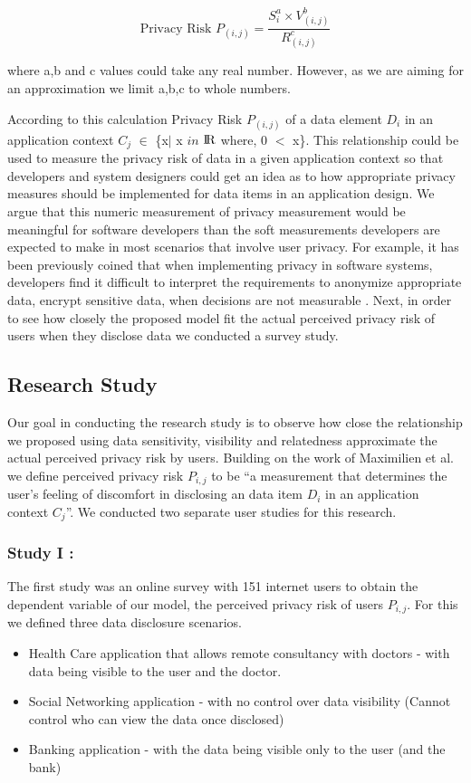 \documentclass[10pt]{article}
\begin{document}
\[
\text {Privacy Risk $P_{(i,j)}$} =\frac{S_{i}^a \times V_{(i,j)}^b}{R_{(i,j)}^ c}
\]

where a,b and c values could take any real number. However, as we are aiming for an approximation we limit a,b,c to whole numbers.

According to this calculation Privacy Risk $P_{(i,j)}$  of a data element \textit {$D_i$} in an application context \textit {$C_j$} $\in$ \{x$\mid$ x $in$ ${\rm I\!R}$ where, 0 $<$ x\}. This relationship could be used to measure the privacy risk of data in a given application context so that developers and system designers could get an idea as to how appropriate privacy measures should be implemented for data items in an application design. We argue that this numeric measurement of privacy measurement would be meaningful for software developers than the soft measurements developers are expected to make in most scenarios that involve user privacy. For example, it has been previously coined that when implementing privacy in software systems, developers find it difficult to interpret the requirements to anonymize appropriate data, encrypt sensitive data, when decisions are not measurable \cite {senarath2018why}. Next, in order to see how closely the proposed model fit the actual perceived privacy risk of users when they disclose data we conducted a survey study.

\subsection{Research Study}

Our goal in conducting the research study is to observe how close the relationship we proposed using data sensitivity, visibility and relatedness approximate the actual perceived privacy risk by users. Building on the work of Maximilien et al. \cite {maximilien2009privacy} we define perceived privacy risk $P_{i,j}$ to be \enquote{a measurement that determines the user's feeling of discomfort in disclosing an data item \textit {$D_i$} in an application context \textit {$C_j$}}. We conducted two separate user studies for this research. 

\subsubsection {Study I : }

The first study was an online survey with 151 internet users to obtain the dependent variable of our model, the perceived privacy risk of users $P_{i,j}$. For this we defined three data disclosure scenarios.
\begin{itemize}
\item Health Care application that allows remote consultancy with doctors - with data being visible to the user and the doctor.
\item Social Networking application - with no control over data visibility (Cannot control who can view the data once disclosed)
\item Banking application - with the data being visible only to the user (and the bank)
\end{itemize}
\end{document}
